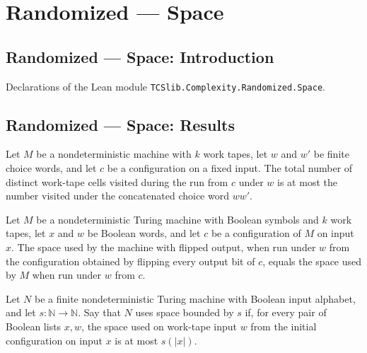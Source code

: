\section{Randomized --- Space}
\subsection*{Randomized --- Space: Introduction}

Declarations of the Lean module \texttt{TCSlib.Complexity.Randomized.Space}.

\subsection*{Randomized --- Space: Results}

\begin{theorem}
\label{Turing.NDTM.spaceUsedWith_le_append}
\leanok
{}
Let $M$ be a nondeterministic machine with $k$ work tapes, let $w$ and $w'$ be finite
choice words, and let $c$ be a configuration on a fixed input. The total number of
distinct work-tape cells visited during the run from $c$ under $w$ is at most the number
visited under the concatenated choice word $ww'$.
\end{theorem}

\begin{theorem}
\label{Turing.NDTM.flipOutput_spaceUsedWith}
\leanok
{}
Let $M$ be a nondeterministic Turing machine with Boolean symbols and $k$ work tapes,
let $x$ and $w$ be Boolean words, and let $c$ be a configuration of $M$ on input $x$.
The space used by the machine with flipped output, when run under $w$ from the
configuration obtained by flipping every output bit of $c$, equals the space used by $M$
when run under $w$ from $c$.
\end{theorem}

\begin{definition}
\label{Turing.FinNDTM.UsesSpace}
\leanok
{}
Let $N$ be a finite nondeterministic Turing machine with Boolean input alphabet, and let
$s:\mathbb{N}\to\mathbb{N}$. Say that $N$ uses space bounded by $s$ if, for every
pair of Boolean lists $x,w$, the space used on work-tape input $w$ from the initial
configuration on input $x$ is at most $s(|x|)$.
\end{definition}

